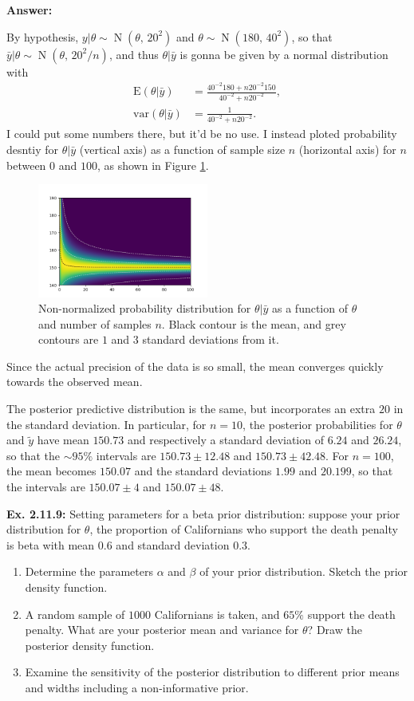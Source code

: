 \documentclass{article}
\newcommand\oname\operatorname
\begin{document}
\textbf{Answer:}

By hypothesis, $y|\theta\sim\oname{N}(\theta,\,20^2)$ and $\theta\sim\oname{N}(180,\,40^2)$, so that $\bar{y}|\theta\sim\oname{N}(\theta,\,20^2/n)$, and thus $\theta|\bar{y}$ is gonna be given by a normal distribution with
\begin{align*}
	\mathrm E(\theta|\bar{y})&=\frac{40^{-2}180+n20^{-2}150}{40^{-2}+n20^{-2}},\\
	\mathrm{var}(\theta|\bar{y})&=\frac1{40^{-2}+n20^{-2}}.
\end{align*}
I could put some numbers there, but it'd be no use. I instead ploted probability desntiy for $\theta|\bar{y}$ (vertical axis) as a function of sample size $n$ (horizontal axis) for $n$ between $0$ and $100$, as shown in Figure \ref{fig:2.11.8}.
\begin{figure}[h]
	\center
	\includegraphics[width=0.5\textwidth]{Numerical/2.11.8.png}
	\caption{Non-normalized probability distribution for $\theta|\bar{y}$ as a function of $\theta$ and number of samples $n$. Black contour is the mean, and grey contours are $1$ and $3$ standard deviations from it.}
	\label{fig:2.11.8}
\end{figure}

Since the actual precision of the data is so small, the mean converges quickly towards the observed mean.

The posterior predictive distribution is the same, but incorporates an extra $20$ in the standard deviation. In particular, for $n=10$, the posterior probabilities for $\theta$ and $\tilde{y}$ have mean $150.73$ and respectively a standard deviation of $6.24$ and $26.24$, so that the $\sim95\%$ intervals are $150.73\pm12.48$ and $150.73\pm42.48$. For $n=100$, the mean becomes $150.07$ and the standard deviations $1.99$ and $20.199$, so that the intervals are $150.07\pm4$ and $150.07\pm48$.

\textbf{Ex. 2.11.9: }Setting parameters for a beta prior distribution: suppose your prior distribution for $\theta$, the proportion of Californians who support the death penalty is beta with mean $0.6$ and standard deviation $0.3$.
\begin{enumerate}[label=\alph*]
	\item Determine the parameters $\alpha$ and $\beta$ of your prior distribution. Sketch the prior density function.
	\item A random sample of $1000$ Californians is taken, and $65\%$ support the death penalty. What are your posterior mean and variance for $\theta$? Draw the posterior density function.
	\item Examine the sensitivity of the posterior distribution to different prior means and widths including a non-informative prior.
\end{enumerate}
\end{document}
